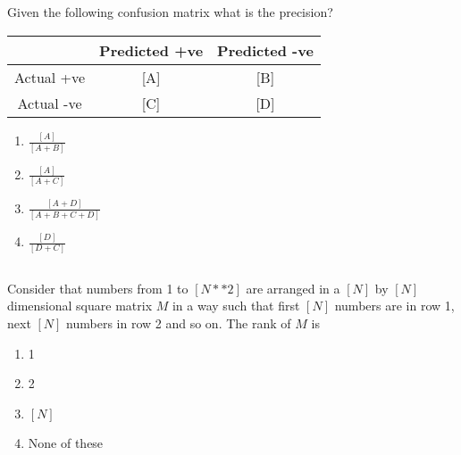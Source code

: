 \begin{frame}
\section{}
Given the following confusion matrix what is the precision?
\begin{table}[!htbp]\centering\begin{tabular}{|c|c|c|}
\hline
& Predicted +ve & Predicted -ve \\ \hline
Actual +ve & [A]            & [B]             \\ \hline
Actual -ve & [C]             & [D]             \\ \hline
\end{tabular}\end{table}
\begin{enumerate}
\item $\frac{[A]}{[A+B]}$
\item $\frac{[A]}{[A+C]}$   %
\item $\frac{[A+D]}{[A+B+C+D]}$
\item $\frac{[D]}{[D+C]}$
\end{enumerate}
\end{frame}

\begin{frame}
\section{}
Consider that numbers from 1 to $[N**2]$ are arranged in a $[N]$ by $[N]$ dimensional square matrix $M$ in a way such that first $[N]$ numbers are in row 1, next $[N]$ numbers in row 2 and so on. The rank of $M$ is
\begin{enumerate}
\item 1
\item 2   %
\item $[N]$
\item None of these
\end{enumerate}
\end{frame}
